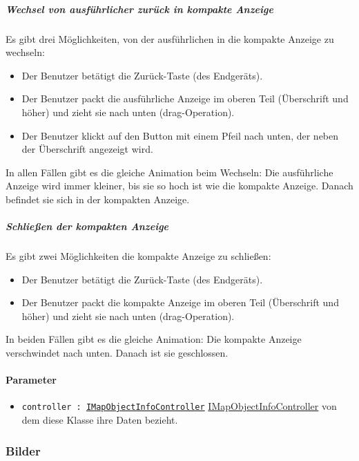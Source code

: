 \subparagraph*{Wechsel von ausführlicher zurück in kompakte Anzeige}
Es gibt drei Möglichkeiten, von der ausführlichen in die kompakte Anzeige zu wechseln:
\begin{itemize}
    \item Der Benutzer betätigt die Zurück-Taste (des Endgeräts).
    \item Der Benutzer packt die ausführliche Anzeige im oberen Teil (Überschrift und höher) und zieht sie nach unten (drag-Operation).
    \item Der Benutzer klickt auf den Button mit einem Pfeil nach unten, der neben der Überschrift angezeigt wird.
\end{itemize}
In allen Fällen gibt es die gleiche Animation beim Wechseln: Die ausführliche Anzeige wird immer 
kleiner, bis sie so hoch ist wie die kompakte Anzeige. Danach befindet sie sich in der kompakten Anzeige.

\subparagraph*{Schließen der kompakten Anzeige}
Es gibt zwei Möglichkeiten die kompakte Anzeige zu schließen:
\begin{itemize}
    \item Der Benutzer betätigt die Zurück-Taste (des Endgeräts).
    \item Der Benutzer packt die kompakte Anzeige im oberen Teil (Überschrift und höher) und zieht sie nach unten (drag-Operation). 
\end{itemize}
In beiden Fällen gibt es die gleiche Animation: Die kompakte Anzeige verschwindet nach unten. Danach ist sie geschlossen.

\paragraph*{Parameter}
\begin{itemize}
    \item \texttt{controller : \hyperref[App_Map_ViewModel_IMapObjectInfoController]{IMapObjectInfoController}} \hyperref[App_Map_ViewModel_IMapObjectInfoController]{IMapObjectInfoController} von dem diese Klasse ihre Daten bezieht.
\end{itemize}

\subsubsection*{Bilder}\label{App_Map_View_MapObjectInfoDisplay_Bilder}
\begin{minipage}{\linewidth}
    \centering
    \begin{minipage}{.49\textwidth}
        \captionsetup[figure]{labelformat=empty}
        \captionsetup[figure]{labelformat=default}
    \end{minipage}
    \begin{minipage}{.49\textwidth}
        \captionsetup[figure]{labelformat=empty}
        \captionsetup[figure]{labelformat=default}
    \end{minipage}
\end{minipage}